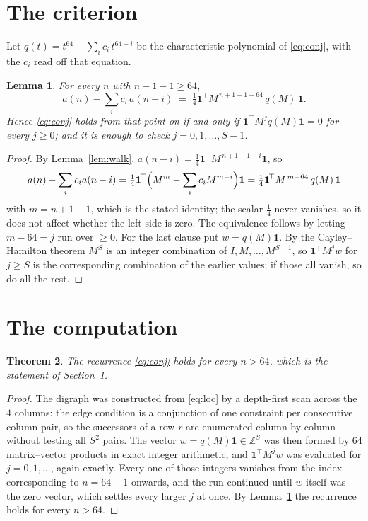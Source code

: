 \documentclass[11pt,a4paper]{article}
\theoremstyle{plain}
\newtheorem{theorem}{Theorem}
\newtheorem{lemma}[theorem]{Lemma}
\theoremstyle{definition}
\begin{document}
\section{The criterion}

Let $q(t)=t^{64}-\sum_i c_i\,t^{64-i}$ be the characteristic polynomial of
\eqref{eq:conj}, with the $c_i$ read off that equation.

\begin{lemma}\label{lem:crit}
For every $n$ with $n+1-1\ge64$,
\[
a(n)-\sum_i c_i\,a(n-i)\;=\;\tfrac1{4}\mathbf{1}^{\!\top}M^{\,n+1-1-64}\,q(M)\,\mathbf{1} .
\]
Hence \eqref{eq:conj} holds from that point on if and only if
$\mathbf{1}^{\!\top}M^{j}q(M)\mathbf{1}=0$ for every $j\ge0$; and it is enough to check
$j=0,1,\dots,S-1$.
\end{lemma}

\begin{proof}
By Lemma~\ref{lem:walk}, $a(n-i)=\tfrac1{4}\mathbf{1}^{\!\top}M^{\,n+1-1-i}\mathbf{1}$, so
\[
a(n)-\sum_i c_i a(n-i)
=\tfrac1{4}\mathbf{1}^{\!\top}\Bigl(M^{m}-\sum_i c_i M^{m-i}\Bigr)\mathbf{1}
=\tfrac1{4}\mathbf{1}^{\!\top}M^{\,m-64}\,q(M)\,\mathbf{1}
\]
with $m=n+1-1$, which is the stated identity; the scalar $\tfrac1{4}$ never vanishes, so
it does not affect whether the left side is zero. The equivalence follows by letting
$m-64=j$ run over $\ge0$. For the last clause put $w=q(M)\mathbf{1}$. By the
Cayley--Hamilton theorem $M^{S}$ is an integer combination of $I,M,\dots,M^{S-1}$, so
$\mathbf{1}^{\!\top}M^{j}w$ for $j\ge S$ is the corresponding combination of the earlier
values; if those all vanish, so do all the rest.
\end{proof}

\section{The computation}

\begin{theorem}
The recurrence \eqref{eq:conj} holds for every $n>64$, which is the statement of
Section~1.
\end{theorem}

\begin{proof}
The digraph was constructed from \eqref{eq:loc} by a depth-first scan across the $4$
columns: the edge condition is a conjunction of one constraint per consecutive column
pair, so the successors of a row $r$ are enumerated column by column without testing all
$S^2$ pairs. The vector $w=q(M)\mathbf{1}\in\mathbb{Z}^{S}$ was then formed by $64$
matrix--vector products in exact integer arithmetic, and $\mathbf{1}^{\!\top}M^{j}w$ was
evaluated for $j=0,1,\dots$, again exactly. Every one of those integers vanishes from the
index corresponding to $n=64+1$ onwards, and the run continued until $w$ itself was the
zero vector, which settles every larger $j$ at once. By Lemma~\ref{lem:crit} the recurrence
holds for every $n>64$.
\end{proof}
\end{document}
